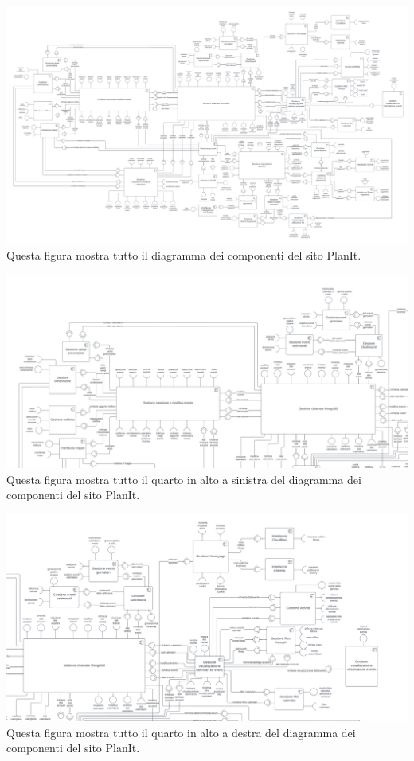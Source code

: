 \begin{center}
    
    \includegraphics[width=1\textwidth,height=0.4\textheight]{img/Diagrammi/Componenti/Diagramma_dei_componenti.png}
    Questa figura mostra tutto il diagramma dei componenti del sito PlanIt.
\end{center}
\begin{center}
    \includegraphics[width=1\textwidth,height=0.3\textheight]{img/Diagrammi/Componenti/P1_Diagramma_dei_componenti.png}
    Questa figura mostra tutto il quarto in alto a sinistra del diagramma dei componenti del sito PlanIt.
\end{center}
\begin{center}
    \includegraphics[width=1\textwidth,height=0.3\textheight]{img/Diagrammi/Componenti/P2_Diagramma_dei_componenti.png}
    Questa figura mostra tutto il quarto in alto a destra del diagramma dei componenti del sito PlanIt.
\end{center}
